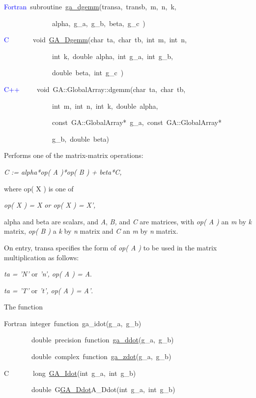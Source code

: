 \textcolor{blue}{Fortran}~subroutine~\href{https://hpc.pnl.gov/globalarrays/api/f_op_api.html\#ga_dgemm}{ga\_{}dgemm}(transa,~transb,~m,~n,~k,~

~~~~~~~~~~~~~~alpha,~g\_a,~g\_b,~beta,~g\_c~)~

\textcolor{blue}{C}~~~~~~~void~\href{https://hpc.pnl.gov/globalarrays/api/c_op_api.html\#ga_dgemm}{GA\_{}Dgemm}(char~ta,~char~tb,~int~m,~int~n,~

~~~~~~~~~~~~~~int~k,~double~alpha,~int~g\_a,~int~g\_b,~

~~~~~~~~~~~~~~double~beta,~int~g\_c~)~

\textcolor{blue}{C++}~~~~~void~GA::GlobalArray::dgemm(char~ta,~char~tb,~

~~~~~~~~~~~~~~int~m,~int~n,~int~k,~double~alpha,~

~~~~~~~~~~~~~~const~GA::GlobalArray{*}~g\_a,~const~GA::GlobalArray{*}~

~~~~~~~~~~~~~~g\_b,~double~beta)

Performs one of the matrix-matrix operations:

\emph{C := alpha{*}op( A ){*}op( B ) + beta{*}C,}

where op( X ) is one of

\emph{op( X ) = X or op( X ) = X',}

alpha and beta are scalars, and \emph{A}, \emph{B,} and \emph{C} are
matrices, with \emph{op( A ) }an \emph{m} by \emph{k} matrix, \emph{op(
B )} a \emph{k} by \emph{n} matrix and \emph{C} an \emph{m} by \emph{n}
matrix.

On entry, transa specifies the form of \emph{op( A )} to be used in
the matrix multiplication as follows: 

\emph{ta = 'N'} or\emph{ 'n', op( A ) = A}. 

\emph{ta = 'T'} or \emph{'t', op( A ) = A'}.

The function

Fortran~integer~function~ga\_idot(g\_a,~g\_b)~

~~~~~~~~double~precision~function~\href{https://hpc.pnl.gov/globalarrays/api/f_op_api.html\#ga_ddot}{ga\_{}ddot}(g\_a,~g\_b)

~~~~~~~~double~complex~function~\href{https://hpc.pnl.gov/globalarrays/api/f_op_api.html\#ga_zdot}{ga\_{}zdot}(g\_a,~g\_b)~

C~~~~~~~long~\href{https://hpc.pnl.gov/globalarrays/api/c_op_api.html\#ga_dot}{GA\_{}Idot}(int~g\_a,~int~g\_b)~

~~~~~~~~double~G\href{https://hpc.pnl.gov/globalarrays/api/c_op_api.html\#ga_dot}{GA\_{}Ddot}A\_Ddot(int~g\_a,~int~g\_b)~

